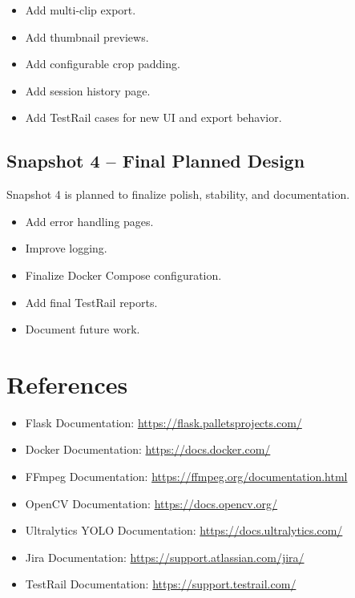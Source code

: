 \documentclass[12pt]{article}
\begin{document}
\begin{itemize}[noitemsep]
    \item Add multi-clip export.
    \item Add thumbnail previews.
    \item Add configurable crop padding.
    \item Add session history page.
    \item Add TestRail cases for new UI and export behavior.
\end{itemize}

\subsection{Snapshot 4 -- Final Planned Design}
Snapshot 4 is planned to finalize polish, stability, and documentation.

\begin{itemize}[noitemsep]
    \item Add error handling pages.
    \item Improve logging.
    \item Finalize Docker Compose configuration.
    \item Add final TestRail reports.
    \item Document future work.
\end{itemize}

\newpage

\section{References}

\begin{itemize}[noitemsep]
    \item Flask Documentation: \url{https://flask.palletsprojects.com/}
    \item Docker Documentation: \url{https://docs.docker.com/}
    \item FFmpeg Documentation: \url{https://ffmpeg.org/documentation.html}
    \item OpenCV Documentation: \url{https://docs.opencv.org/}
    \item Ultralytics YOLO Documentation: \url{https://docs.ultralytics.com/}
    \item Jira Documentation: \url{https://support.atlassian.com/jira/}
    \item TestRail Documentation: \url{https://support.testrail.com/}
\end{itemize}
\end{document}
